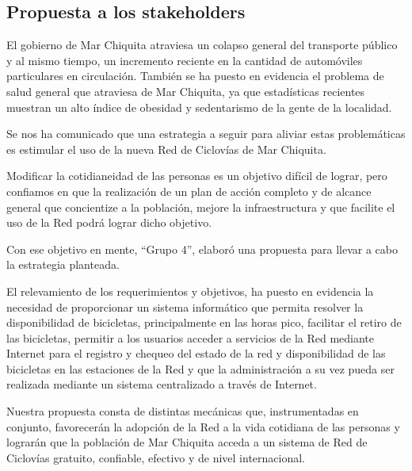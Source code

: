 \subsection{Propuesta a los stakeholders}

El gobierno de Mar Chiquita atraviesa un colapso general del transporte público y al mismo tiempo, un incremento reciente en la cantidad de automóviles particulares en circulación. También se ha puesto en evidencia el problema de salud general que atraviesa de Mar Chiquita, ya que estadísticas recientes muestran un alto índice de obesidad y sedentarismo de la gente de la localidad.

Se nos ha comunicado que una estrategia a seguir para aliviar estas problemáticas es estimular el uso de la nueva Red de Ciclovías de Mar Chiquita.

Modificar la cotidianeidad de las personas es un objetivo difícil de lograr, pero confiamos en que la realización de un plan de acción completo y de alcance general que concientize a la población, mejore la infraestructura y que facilite el uso de la Red podrá lograr dicho objetivo.

Con ese objetivo en mente, “Grupo 4”, elaboró una propuesta para llevar a cabo la estrategia planteada.

El relevamiento de los requerimientos y objetivos, ha puesto en evidencia la necesidad de proporcionar un sistema informático que permita resolver la disponibilidad de bicicletas, principalmente en las horas pico, facilitar el retiro de las bicicletas, permitir a los usuarios acceder a servicios de la Red mediante Internet para el registro y chequeo del estado de la red y disponibilidad de las bicicletas en las estaciones de la Red y que la administración a su vez pueda ser realizada mediante un sistema centralizado a través de Internet. 

Nuestra propuesta consta de distintas mecánicas que, instrumentadas en conjunto, favorecerán la adopción de la Red a la vida cotidiana de las personas y lograrán que la población de Mar Chiquita acceda a un sistema de Red de Ciclovías gratuito, confiable, efectivo y de nivel internacional.
